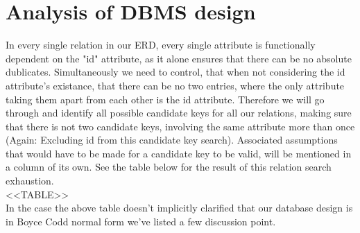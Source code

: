 \section{Analysis of DBMS design}
In every single relation in our ERD, every single attribute is functionally dependent on the "id" attribute, as it alone ensures that there can be no absolute dublicates. Simultaneously we need to control, that when not considering the id attribute's existance, that there can be no two entries, where the only attribute taking them apart from each other is the id attribute.
Therefore we will go through and identify all possible candidate keys for all our relations, making sure that there is not two candidate keys, involving the same attribute more than once (Again: Excluding id from this candidate key search). Associated assumptions that would have to be made for a candidate key to be valid, will be mentioned in a column of its own.
See the table below for the result of this relation search exhaustion.\\

<<TABLE>>\\

In the case the above table doesn't implicitly clarified that our database design is in Boyce Codd normal form we've listed a few discussion point.\\ 


